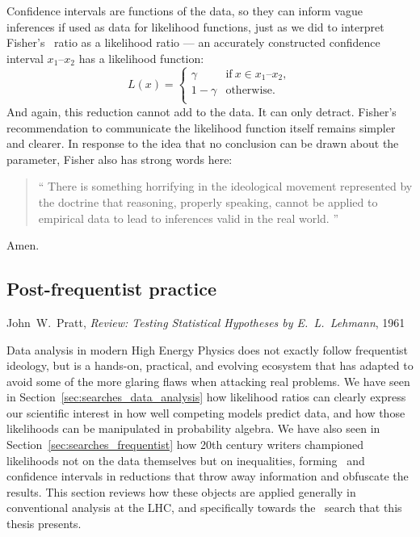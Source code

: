 Confidence intervals are functions of the data, so they can inform vague
inferences if used as data for likelihood functions, just as we did to
interpret Fisher's \pvalue\ ratio as a likelihood ratio ---
an accurately constructed confidence interval $x_1\textrm{--}x_2$ has a
likelihood function:
\begin{equation}
L(x) =
\left\{
\begin{matrix}
\gamma & \textrm{if}~x \in x_1\textrm{--}x_2, \\
1 - \gamma & \textrm{otherwise.} \\
\end{matrix}
\right.
\end{equation}
And again, this reduction cannot add to the data.
It can only detract.
Fisher's recommendation to communicate the likelihood function itself
remains simpler and clearer.
In response to the idea that no conclusion can be drawn about the parameter,
Fisher also has strong words here:
\begin{quote}
\small
``%
There is something horrifying in the ideological movement represented by the
doctrine that reasoning, properly speaking, cannot be applied to empirical data
to lead to inferences valid in the real world.%
''~\cite{fisher1956statistical}
\end{quote}
Amen.

\begin{singlespacing}
\section{Post-frequentist practice}
\label{sec:searches_practice}
\begin{epigraphs}
%
{John~W.~Pratt,
\textit{Review: Testing Statistical Hypotheses
by E.~L.~Lehmann},
1961~\cite{pratt1961testing}}
\end{epigraphs}
\end{singlespacing}

\noindent Data analysis in modern High Energy Physics does not exactly follow frequentist
ideology, but is a hands-on, practical, and evolving ecosystem that has adapted
to avoid some of the more glaring flaws when attacking real problems.
We have seen in Section~\ref{sec:searches_data_analysis} how likelihood ratios
can clearly express our scientific interest in how well competing models
predict data, and how those likelihoods can be manipulated in probability
algebra.
We have also seen in Section~\ref{sec:searches_frequentist} how 20th century
writers championed likelihoods not on the data themselves but on inequalities,
forming \pvalues\ and confidence intervals in reductions that throw away
information and obfuscate the results.
This section reviews how these objects are applied generally in conventional
analysis at the LHC, and specifically towards the \atlas\ search that this
thesis presents.


